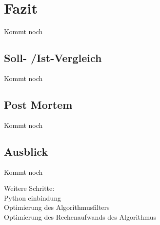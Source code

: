 \section{Fazit}
 Kommt noch

\subsection{Soll- /Ist-Vergleich}
Kommt noch

\subsection{Post Mortem}
Kommt noch

\subsection{Ausblick}
Kommt noch

Weitere Schritte:\\
Python einbindung\\
Optimierung des Algorithmusfilters\\
Optimierung des Rechenaufwands des Algorithmus\\